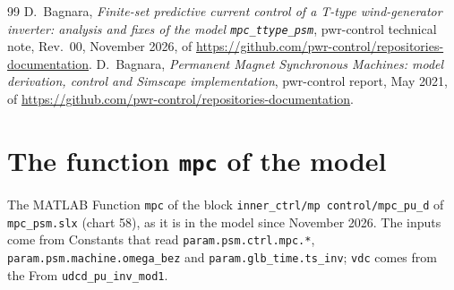 \documentclass[11pt,a4paper]{scrartcl}
\newcommand{\code}[1]{\texttt{#1}}
\begin{document}
\begin{onehalfspace}
\begin{thebibliography}{99}
	 D.~Bagnara, \textit{Finite-set predictive current control of a T-type wind-generator inverter: analysis and fixes of the model \code{mpc\_ttype\_psm}}, pwr-control technical note, Rev.~00, November 2026,  of \url{https://github.com/pwr-control/repositories-documentation}.
	 D.~Bagnara, \textit{Permanent Magnet Synchronous Machines: model derivation, control and Simscape implementation}, pwr-control report, May 2021,  of \url{https://github.com/pwr-control/repositories-documentation}.
\end{thebibliography}

\clearpage
\appendix
\section{The function \code{mpc} of the model}
\label{app:mpc}

The MATLAB Function \code{mpc} of the block \code{inner\_ctrl/mp control/mpc\_pu\_d} of \code{mpc\_psm.slx} (chart 58), as it is in the model since November 2026. The inputs come from Constants that read \code{param.psm.ctrl.mpc.*}, \code{param.psm.machine.omega\_bez} and \code{param.glb\_time.ts\_inv}; \code{vdc} comes from the From \code{udcd\_pu\_inv\_mod1}.


\end{onehalfspace}
\end{document}

